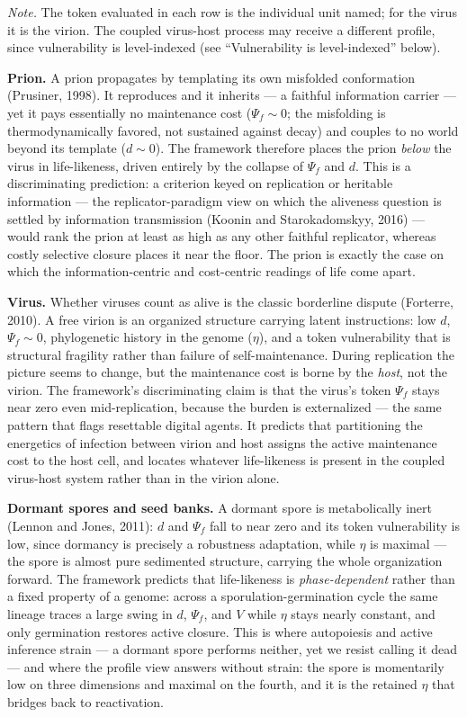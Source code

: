 \documentclass[Afour,sageh,times,doublespace]{sagej}
\begin{document}
\emph{Note.} The token evaluated in each row is the individual unit named; for the virus it is the virion. The coupled virus-host process may receive a different profile, since vulnerability is level-indexed (see ``Vulnerability is level-indexed'' below).

\textbf{Prion.} A prion propagates by templating its own misfolded conformation (Prusiner, 1998). It reproduces and it inherits --- a faithful information carrier --- yet it pays essentially no maintenance cost (\(\Psi_f \sim 0\); the misfolding is thermodynamically favored, not sustained against decay) and couples to no world beyond its template (\(d \sim 0\)). The framework therefore places the prion \emph{below} the virus in life-likeness, driven entirely by the collapse of \(\Psi_f\) and \(d\). This is a discriminating prediction: a criterion keyed on replication or heritable information --- the replicator-paradigm view on which the aliveness question is settled by information transmission (Koonin and Starokadomskyy, 2016) --- would rank the prion at least as high as any other faithful replicator, whereas costly selective closure places it near the floor. The prion is exactly the case on which the information-centric and cost-centric readings of life come apart.

\textbf{Virus.} Whether viruses count as alive is the classic borderline dispute (Forterre, 2010). A free virion is an organized structure carrying latent instructions: low \(d\), \(\Psi_f \sim 0\), phylogenetic history in the genome (\(\eta\)), and a token vulnerability that is structural fragility rather than failure of self-maintenance. During replication the picture seems to change, but the maintenance cost is borne by the \emph{host}, not the virion. The framework's discriminating claim is that the virus's token \(\Psi_f\) stays near zero even mid-replication, because the burden is externalized --- the same pattern that flags resettable digital agents. It predicts that partitioning the energetics of infection between virion and host assigns the active maintenance cost to the host cell, and locates whatever life-likeness is present in the coupled virus-host system rather than in the virion alone.

\textbf{Dormant spores and seed banks.} A dormant spore is metabolically inert (Lennon and Jones, 2011): \(d\) and \(\Psi_f\) fall to near zero and its token vulnerability is low, since dormancy is precisely a robustness adaptation, while \(\eta\) is maximal --- the spore is almost pure sedimented structure, carrying the whole organization forward. The framework predicts that life-likeness is \emph{phase-dependent} rather than a fixed property of a genome: across a sporulation-germination cycle the same lineage traces a large swing in \(d\), \(\Psi_f\), and \(V\) while \(\eta\) stays nearly constant, and only germination restores active closure. This is where autopoiesis and active inference strain --- a dormant spore performs neither, yet we resist calling it dead --- and where the profile view answers without strain: the spore is momentarily low on three dimensions and maximal on the fourth, and it is the retained \(\eta\) that bridges back to reactivation.
\end{document}
